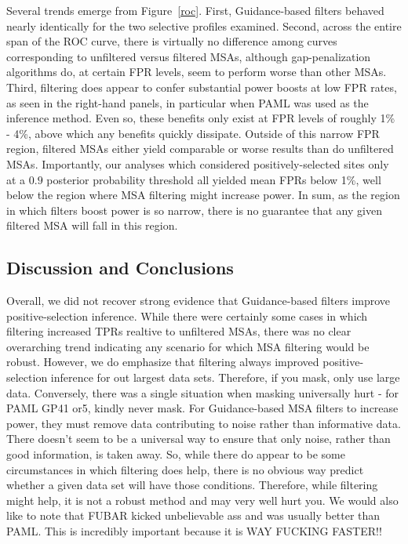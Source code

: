 \documentclass[11pt]{article}
\begin{document}
Several trends emerge from Figure~\ref{roc}. First, Guidance-based filters behaved nearly identically for the two selective profiles examined. Second, across the entire span of the ROC curve, there is virtually no difference among curves corresponding to unfiltered versus filtered MSAs, although gap-penalization algorithms do, at certain FPR levels, seem to perform worse than other MSAs. Third, filtering does appear to confer substantial power boosts at low FPR rates, as seen in the right-hand panels, in particular when PAML was used as the inference method. Even so, these benefits only exist at FPR levels of roughly 1\% - 4\%, above which any benefits quickly dissipate. Outside of this narrow FPR region, filtered MSAs either yield comparable or worse results than do unfiltered MSAs. Importantly, our analyses which considered positively-selected sites only at a $0.9$ posterior probability threshold all yielded mean FPRs below 1\%, well below the region where MSA filtering might increase power. In sum, as the region in which filters boost power is so narrow, there is no guarantee that any given filtered MSA will fall in this region.

\subsection*{Discussion and Conclusions}

Overall, we did not recover strong evidence that Guidance-based filters improve positive-selection inference. While there were certainly some cases in which filtering increased TPRs realtive to unfiltered MSAs, there was no clear overarching trend indicating any scenario for which MSA filtering would be robust. However, we do emphasize that filtering always improved positive-selection inference for out largest data sets. Therefore, if you mask, only use large data.
Conversely, there was a single situation when masking universally hurt - for PAML GP41 or5, kindly never mask. 
For Guidance-based MSA filters to increase power, they must remove data contributing to noise rather than informative data. There doesn't seem to be a universal way to ensure that only noise, rather than good information, is taken away. So, while there do appear to be some circumstances in which filtering does help, there is no obvious way predict whether a given data set will have those conditions. Therefore, while filtering might help, it is not a robust method and may very well hurt you. 
We would also like to note that FUBAR kicked unbelievable ass and was usually better than PAML. This is incredibly important because it is WAY FUCKING FASTER!!
\end{document}
